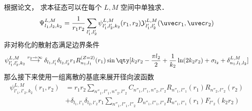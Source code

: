 
根据论文， 求本征态可以在每个 $L,M$ 空间中单独求．
\begin{equation}
\Psi_{l_1,l_2,k_2}^{L,M} = \frac{1}{r_1 r_2}\sum_{l'_1, l'_2}  \psi_{l'_1, l'_2, k_2}^{L, M}(r_1, r_2)\mathcal{Y}_{l'_1, l'_2}^{L, M}(\uvec r_1, \uvec r_2)
\end{equation}
非对称化的散射态满足边界条件
\begin{equation}
\psi_{l'_1,l'_2,k_2}^{L, M} \overset{r_2\to\infty}{\longrightarrow} \delta_{l_1,l'_1}\delta_{l_2,l'_2} r_1 R_{n_1,l_1}^{(Z=2)}(r_1)
\sin\qty[k_2 r_2 - \frac{\pi l_2}{2} +\frac{1}{k_2}\ln(2k_2 r_2) + \sigma_{l_2} + \delta_{n_1,l_1,l_2}^{L,M}]
\end{equation}
那么接下来使用一组离散的基底来展开径向波函数
\begin{equation}
\begin{aligned}
\psi_{l'_1, l'_2,k_2}^{L, M}(r_1, r_2) &= r_1r_2\sum_{n''_1,l''_1,n''_2,l''_2} C_{n''_1,l''_1,n''_2,l''_2} R_{n''_1,l''_1}(r_1) R_{n''_2,l''_2}(r_2)\\
& +\delta_{l_1,l'_1}\delta_{l_2,l'_2} r_1\sum_{n''_1,l''_1,l''_2} D_{n''_1,l''_1,l''_2} R_{n''_1,l''_1}(r_1) F_{l''_2}(k_2 r_2)
\end{aligned}
\end{equation}


